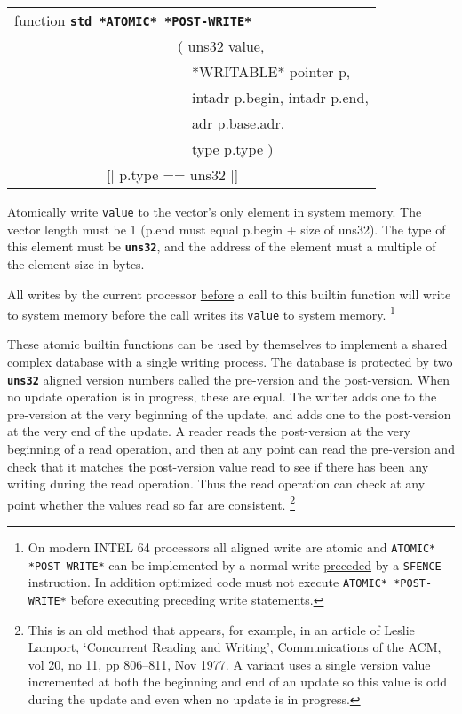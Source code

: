 \documentclass[12pt]{article}
\makeatletter
\newcommand{\TT}[1]{{\tt \bfseries #1}}
\newcommand{\ttstdkey}[1]{\TT{std #1}\index{#1@{\tt std #1}}}
\newenvironment{indpar}[1][0.3in]%
	{\begin{list}{}%
		     {\setlength{\itemsep}{0in}%
		      \setlength{\topsep}{0in}%
		      \setlength{\parsep}{1ex}%
		      \setlength{\labelwidth}{#1}%
		      \setlength{\leftmargin}{#1}%
		      \addtolength{\leftmargin}{\labelsep}}%
	 \item}%
	{\end{list}}
\makeatother
\begin{document}
\begin{indpar}
{\tt\begin{tabular}{@{}l}
function \ttstdkey{*ATOMIC* *POST-WRITE*} \\
~~~~~~~~~~~~~~~~~~~~~~~( uns32 value, \\
~~~~~~~~~~~~~~~~~~~~~~~~~*WRITABLE* pointer p, \\
~~~~~~~~~~~~~~~~~~~~~~~~~intadr p.begin, intadr p.end, \\
~~~~~~~~~~~~~~~~~~~~~~~~~adr p.base.adr, \\
~~~~~~~~~~~~~~~~~~~~~~~~~type p.type ) \\
~~~~~~~~~~~~~[| p.type == uns32 |] \\
\end{tabular}}

\begin{indpar}
Atomically write {\tt value} to the vector's only element in system memory.
The vector length must be 1 (p.end must equal p.begin + size of uns32).
The type of this element must be \TT{uns32}, and the address of the element
must a multiple of the element size in bytes.

All writes by the current processor \underline{before} a call to
this builtin function will write
to system memory \underline{before} the call writes its {\tt value}
to system memory.%
\footnote{On modern INTEL 64 processors
all aligned write are atomic and {\tt *ATOMIC* *POST-WRITE*} can be implemented
by a normal write \underline{preceded} by a {\tt SFENCE} instruction.  In
addition optimized code must not execute {\tt *ATOMIC* *POST-WRITE*}
before executing preceding write statements.}
\end{indpar}

\end{indpar}

These atomic builtin functions can be used by themselves to
implement a shared complex database with a single writing process.
The database is protected by two \TT{uns32} aligned version numbers
called the pre-version and the post-version.  When no update operation
is in progress, these are equal.  The writer adds one to the pre-version
at the very beginning of the update, and adds one to the post-version
at the very end of the update.  A reader reads the post-version at
the very beginning of a read operation, and then at any point can
read the pre-version and check that it matches the post-version value
read to see if there has been any writing during the read operation.
Thus the read operation can check at any point
whether the values read so far are consistent.%
\footnote{This is an old method that appears, for example, in 
an article of Leslie Lamport, `Concurrent Reading and Writing',
Communications of the ACM, vol 20, no 11, pp 806--811, Nov 1977.
A variant uses a single version value incremented at both the
beginning and end of an update so this value is odd during the update
and even when no update is in progress.}
\end{document}
